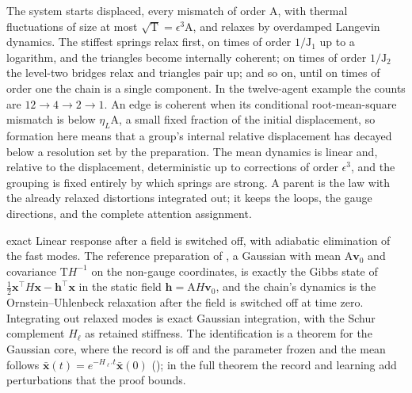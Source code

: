 The system starts displaced, every mismatch of order \(\mathrm A\), with thermal fluctuations of size at
most \(\sqrt{\mathrm T}=\epsilon^3\mathrm A\), and relaxes by overdamped Langevin dynamics. The stiffest springs
relax first, on times of order \(1/\mathrm J_1\) up to a logarithm, and the triangles become internally
coherent; on times of order \(1/\mathrm J_2\) the level-two bridges relax and triangles pair up; and so on,
until on times of order one the chain is a single component. In the twelve-agent example the counts are
\(12\to4\to2\to1\). An edge is coherent when its conditional root-mean-square mismatch is below
\(\eta_L\mathrm A\), a small fixed fraction of the initial displacement, so formation here means that a
group's internal relative displacement has decayed below a resolution set by the preparation. The mean
dynamics is linear and, relative to the displacement, deterministic up to corrections of order
\(\epsilon^3\), and the grouping is fixed entirely by which springs are strong. A parent is the law with
the already relaxed distortions integrated out; it keeps the loops, the gauge directions, and the
complete attention assignment.

\begin{analogy}{exact}
Linear response after a field is switched off, with adiabatic elimination of the fast modes. The
reference preparation of , a Gaussian with mean \(\mathrm A\mathbf v_0\) and
covariance \(\mathrm TH^{-1}\) on the non-gauge coordinates, is exactly the Gibbs state of
\(\tfrac12\mathbf x^\top H\mathbf x-\mathbf h^\top\mathbf x\) in the static field
\(\mathbf h=\mathrm AH\mathbf v_0\), and the chain's dynamics is the Ornstein--Uhlenbeck relaxation after
the field is switched off at time zero. Integrating out relaxed modes is exact Gaussian integration, with
the Schur complement \(H_\ell\) as retained stiffness. The identification is a theorem for the Gaussian
core, where the record is off and the parameter frozen and the mean follows
\(\bar{\mathbf x}(t)=e^{-H_{\ell'}t}\bar{\mathbf x}(0)\) (); in the full
theorem the record and learning add perturbations that the proof bounds.
\end{analogy}

